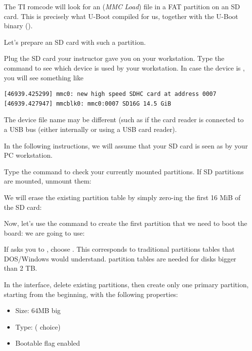 The TI romcode will look for an  ({\em MMC Load})
file in a FAT partition on an SD card. This is precisely what U-Boot
compiled for us, together with the U-Boot binary ().

Let's prepare an SD card with such a partition.

Plug the SD card your instructor gave you on your workstation. Type
the  command to see which device is used by your
workstation. In case the device is , you will see
something like

\begin{verbatim}
[46939.425299] mmc0: new high speed SDHC card at address 0007
[46939.427947] mmcblk0: mmc0:0007 SD16G 14.5 GiB
\end{verbatim}

The device file name may be different (such as 
if the card reader is connected to a USB bus (either internally
or using a USB card reader).

In the following instructions, we will assume that your SD card is
seen as  by your PC workstation.

Type the  command to check your currently mounted
partitions. If SD partitions are mounted, unmount them:


We will erase the existing partition table by simply zero-ing the
first 16 MiB of the SD card:


Now, let's use the  command to create the first partition
that we need to boot the board:
we are going to use:


If  asks you to , choose
. This corresponds to traditional partitions tables that DOS/Windows
would understand.  partition tables are needed for disks bigger
than 2 TB.

In the  interface, delete existing partitions, then
create only one primary partition, starting from the beginning, with the 
following properties:

\begin{itemize}
\item Size: 64MB big
\item Type:  ( choice)
\item Bootable flag enabled
\end{itemize}

